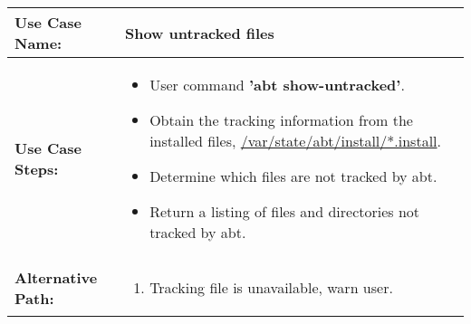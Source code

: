 \medskip

\begin{tabularx}{\linewidth}{|l|X|}
\hline
\textbf{Use Case Name:} & \textbf{Show untracked files} \\
\hline
\textbf{Use Case Steps:} & 
\begin{minipage}{\linewidth} 
  \vspace{0.05em}
  \begin{itemize}
    \item User command \textbf{'abt show-untracked'}.
    \item Obtain the tracking information from the installed files, \url{/var/state/abt/install/*.install}.
    \item Determine which files are not tracked by abt.
    \item Return a listing of files and directories not tracked by abt.
  \end{itemize}
  \vspace{0.05em}
\end{minipage}
\\
\hline 
\textbf{Alternative Path:} &
\begin{minipage}{\linewidth}
  \vspace{0.05em} 
  \begin{enumerate}
    \item Tracking file is unavailable, warn user.
  \end{enumerate}
  \vspace{0.05em} 
\end{minipage}
\\
\hline
\end{tabularx}